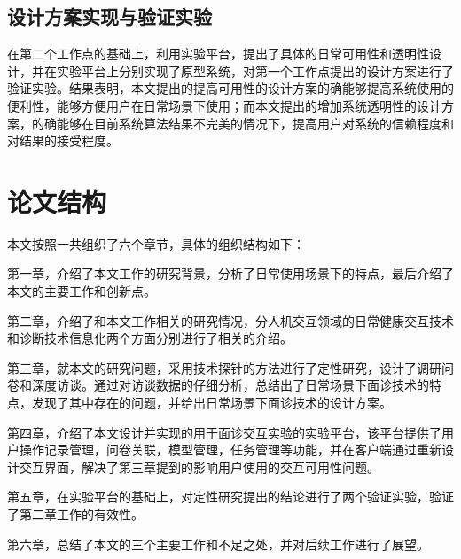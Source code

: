 \subsection{设计方案实现与验证实验}

在第二个工作点的基础上，利用实验平台，提出了具体的日常可用性和透明性设计，并在实验平台上分别实现了原型系统，对第一个工作点提出的设计方案进行了验证实验。结果表明，本文提出的提高可用性的设计方案的确能够提高系统使用的便利性，能够方便用户在日常场景下使用；而本文提出的增加系统透明性的设计方案，的确能够在目前系统算法结果不完美的情况下，提高用户对系统的信赖程度和对结果的接受程度。




\section{论文结构}
本文按照一共组织了六个章节，具体的组织结构如下：

第一章，介绍了本文工作的研究背景，分析了日常使用场景下的特点，最后介绍了本文的主要工作和创新点。

第二章，介绍了和本文工作相关的研究情况，分人机交互领域的日常健康交互技术和诊断技术信息化两个方面分别进行了相关的介绍。

第三章，就本文的研究问题，采用技术探针的方法进行了定性研究，设计了调研问卷和深度访谈。通过对访谈数据的仔细分析，总结出了日常场景下面诊技术的特点，发现了其中存在的问题，并给出日常场景下面诊技术的设计方案。

第四章，介绍了本文设计并实现的用于面诊交互实验的实验平台，该平台提供了用户操作记录管理，问卷关联，模型管理，任务管理等功能，并在客户端通过重新设计交互界面，解决了第三章提到的影响用户使用的交互可用性问题。

第五章，在实验平台的基础上，对定性研究提出的结论进行了两个验证实验，验证了第二章工作的有效性。

第六章，总结了本文的三个主要工作和不足之处，并对后续工作进行了展望。